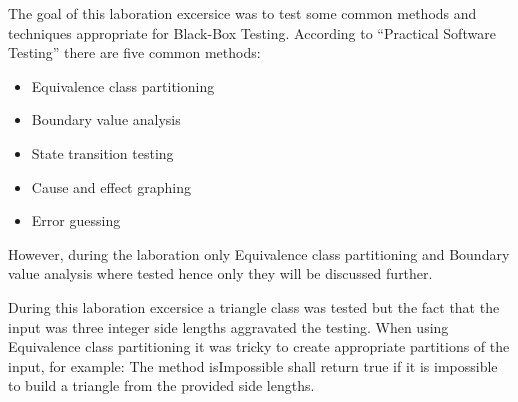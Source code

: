 The goal of this laboration excersice was to test some common methods and techniques appropriate for Black-Box Testing.
According to "`Practical Software Testing"' there are five common methods:
\begin{itemize}
	\item Equivalence class partitioning
	\item Boundary value analysis
	\item State transition testing
	\item Cause and effect graphing
	\item Error guessing
\end{itemize}

However, during the laboration only Equivalence class partitioning and Boundary value analysis where tested hence only they will be discussed further.

During this laboration excersice a triangle class was tested but the fact that the input was three integer side lengths aggravated the testing. 
When using Equivalence class partitioning it was tricky to create appropriate partitions of the input, for example:
The method isImpossible shall return true if it is impossible to build a triangle from the provided side lengths. 